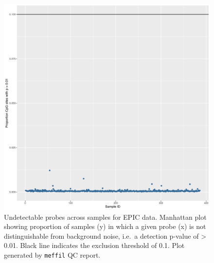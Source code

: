 \documentclass[
]{book}
\begin{document}
\begin{figure}

{\centering \includegraphics[width=0.8\linewidth]{figs/MAVIDOS-II-qcEPICpropSamples} 

}

\caption{Undetectable probes across samples for EPIC data. Manhattan plot showing proportion of samples (y) in which a given probe (x) is not distinguishable from background noise, i.e.~a detection p-value of \textgreater{} 0.01. Black line indicates the exclusion threshold of 0.1. Plot generated by \texttt{meffil} QC report.}\label{fig:MAVIDOSIIqcEPICpropSamples}
\end{figure}
\end{document}
